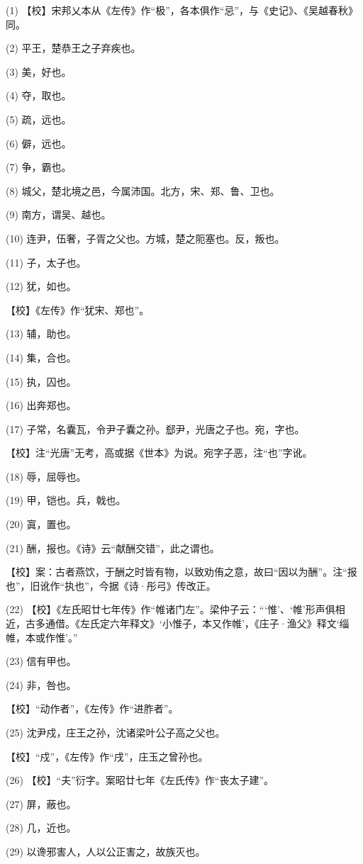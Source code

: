 \documentclass[12pt,UTF8]{ctexbook}
\begin{document}
(1) 【校】宋邦乂本从《左传》作“极”，各本俱作“忌”，与《史记》、《吴越春秋》同。

(2) 平王，楚恭王之子弃疾也。

(3) 美，好也。

(4) 夺，取也。

(5) 疏，远也。

(6) 僻，远也。

(7) 争，霸也。

(8) 城父，楚北境之邑，今属沛国。北方，宋、郑、鲁、卫也。

(9) 南方，谓吴、越也。

(10) 连尹，伍奢，子胥之父也。方城，楚之阨塞也。反，叛也。

(11) 子，太子也。

(12) 犹，如也。

【校】《左传》作“犹宋、郑也”。

(13) 辅，助也。

(14) 集，合也。

(15) 执，囚也。

(16) 出奔郑也。

(17) 子常，名囊瓦，令尹子囊之孙。郄尹，光唐之子也。宛，字也。

【校】注“光唐”无考，高或据《世本》为说。宛字子恶，注“也”字讹。

(18) 辱，屈辱也。

(19) 甲，铠也。兵，戟也。

(20) 寘，置也。

(21) 酬，报也。《诗》云“献酬交错”，此之谓也。

【校】案：古者燕饮，于酬之时皆有物，以致劝侑之意，故曰“因以为酬”。注“报也”，旧讹作“执也”，今据《诗·彤弓》传改正。

(22) 【校】《左氏昭廿七年传》作“帷诸门左”。梁仲子云：“‘惟’、‘帷’形声俱相近，古多通借。《左氏定六年释文》‘小惟子，本又作帷’，《庄子·渔父》释文‘缁帷，本或作惟’。”

(23) 信有甲也。

(24) 非，咎也。

【校】“动作者”，《左传》作“进胙者”。

(25) 沈尹戍，庄王之孙，沈诸梁叶公子高之父也。

【校】“戍”，《左传》作“戌”，庄玉之曾孙也。

(26) 【校】“夫”衍字。案昭廿七年《左氏传》作“丧太子建”。

(27) 屏，蔽也。

(28) 几，近也。

(29) 以谗邪害人，人以公正害之，故族灭也。
\end{document}

